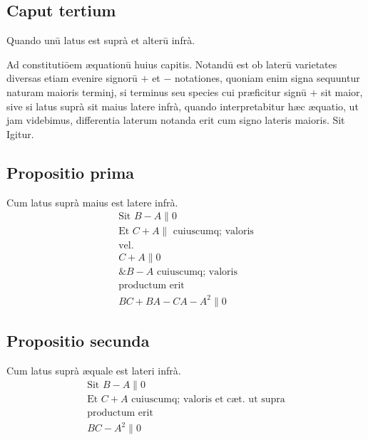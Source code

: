 \documentclass[11pt,a4paper]{article}
\begin{document}
\subsection*{Caput tertium}

Quando unū latus est suprà et alterū infrà.

Ad constitutiōem æquationū huius capitis. Notandū est ob laterū varietates diversas etiam evenire signorū $+$ et $-$ notationes, quoniam enim signa sequuntur naturam maioris terminj, si terminus seu species cui præficitur signū $+$ sit maior, sive si latus suprà sit maius latere infrà, quando interpretabitur hæc æquatio, ut jam videbimus, differentia laterum notanda erit cum signo lateris maioris. Sit Igitur.


\subsection*{Propositio prima}

Cum latus suprà maius est latere infrà.
\[ \begin{array}{l} \text{Sit } B - A \parallel 0 \\ \text{Et } C + A \parallel \text{ cuiuscumq; valoris} \\ \text{vel.} \\ C + A \parallel 0 \\ \text{\& } B - A \text{ cuiuscumq; valoris} \\ \text{productum erit} \\ BC + BA - CA - A^{2} \parallel 0 \end{array} \]

\subsection*{Propositio secunda}

Cum latus suprà æquale est lateri infrà.
\[ \begin{array}{l} \text{Sit } B - A \parallel 0 \\ \text{Et } C + A \text{ cuiuscumq; valoris et cæt. ut supra} \\ \text{productum erit} \\ BC - A^{2} \parallel 0 \end{array} \]
\end{document}
